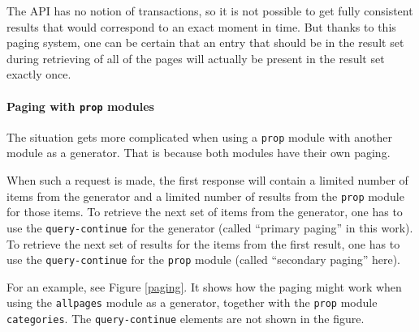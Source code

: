 The \ac{API} has no notion of transactions, so it is not possible to get fully consistent results
that would correspond to an exact moment in time.
But thanks to this paging system, one can be certain that an entry that should be in the result set
during retrieving of all of the pages will actually be present in the result set exactly once.

\paragraph{Paging with \texttt{prop} modules}

The situation gets more complicated when using a \texttt{prop} module with another module as a generator.
That is because both modules have their own paging.

When such a request is made, the first response will contain a limited number of items from the generator
and a limited number of results from the \texttt{prop} module for those items.
To retrieve the next set of items from the generator, one has to use the \texttt{query-continue} for the generator
(called “primary paging” in this work).
To retrieve the next set of results for the items from the first result,
one has to use the \texttt{query-continue} for the \texttt{prop} module (called “secondary paging” here).

For an example, see Figure \ref{paging}.
It shows how the paging might work when using the \texttt{allpages} module as a generator,
together with the \texttt{prop} module \texttt{categories}.
The \texttt{query-continue} elements are not shown in the figure.

